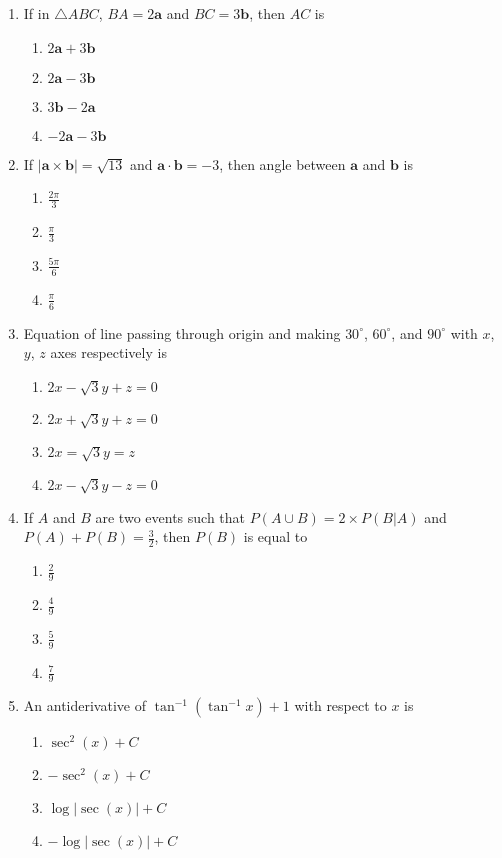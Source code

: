\documentclass{article}
\begin{document}
\begin{enumerate}
\item If in $\triangle ABC$, $BA = 2\mathbf{a}$ and $BC = 3\mathbf{b}$, then $AC$ is
\begin{enumerate}
\item $2\mathbf{a} + 3\mathbf{b}$
\item $2\mathbf{a} - 3\mathbf{b}$
\item $3\mathbf{b} - 2\mathbf{a}$
\item $-2\mathbf{a} - 3\mathbf{b}$
\end{enumerate}

\item If $|\mathbf{a} \times \mathbf{b}| = \sqrt{13}$ and $\mathbf{a} \cdot \mathbf{b} = -3$, then angle between $\mathbf{a}$ and $\mathbf{b}$ is
\begin{enumerate}
\item $\frac{2\pi}{3}$
\item $\frac{\pi}{3}$
\item $\frac{5\pi}{6}$
\item $\frac{\pi}{6}$
\end{enumerate}

\item Equation of line passing through origin and making $30^\circ$, $60^\circ$, and $90^\circ$ with $x$, $y$, $z$ axes respectively is
\begin{enumerate}
\item $2x - \sqrt{3}y + z = 0$
\item $2x + \sqrt{3}y + z = 0$
\item $2x = \sqrt{3}y = z$
\item $2x - \sqrt{3}y - z = 0$
\end{enumerate}

\item If $A$ and $B$ are two events such that $P(A \cup B) = 2 \times P(B|A)$ and $P(A) + P(B) = \frac{3}{2}$, then $P(B)$ is equal to
\begin{enumerate}
\item $\frac{2}{9}$
\item $\frac{4}{9}$
\item $\frac{5}{9}$
\item $\frac{7}{9}$
\end{enumerate}

\item An antiderivative of $\tan^{-1}(\tan^{-1}x) + 1$ with respect to $x$ is
\begin{enumerate}
\item $\sec^2(x) + C$
\item $-\sec^2(x) + C$
\item $\log|\sec(x)| + C$
\item $-\log|\sec(x)| + C$
\end{enumerate}


\end{enumerate}
\end{document}
